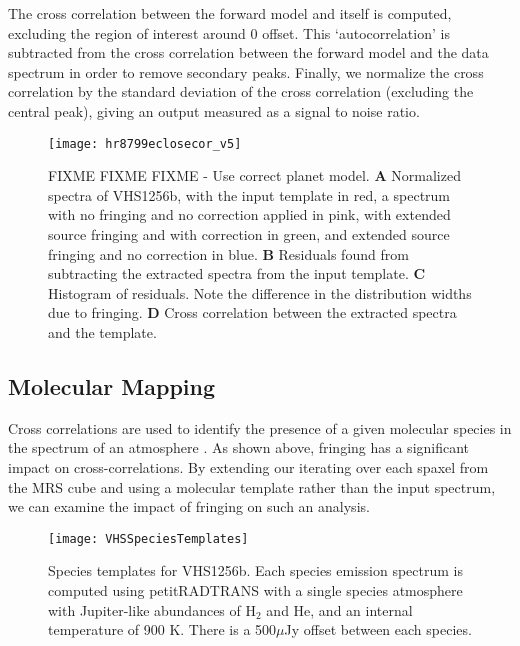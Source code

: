 The cross correlation between the forward model and itself is computed, excluding the region of interest around 0 offset. 
This `autocorrelation' is subtracted from the cross correlation between the forward model and the data spectrum in order to remove secondary peaks.
Finally, we normalize the cross correlation by the standard deviation of the cross correlation (excluding the central peak), giving an output measured as a signal to noise ratio.
\begin{figure}[h]
	\centering
	\texttt{[image: hr8799eclosecor\_v5]}
	\caption{FIXME FIXME FIXME - Use correct planet model. \textbf{A} Normalized spectra of VHS1256b, with the input template in red, a spectrum with no fringing and no correction applied in pink, with extended source fringing and with correction in green, and extended source fringing and no correction in blue. \textbf{B} Residuals found from subtracting the extracted spectra from the input template. \textbf{C} Histogram of residuals. Note the difference in the distribution widths due to fringing. \textbf{D} Cross correlation between the extracted spectra and the template.}
	\label{fig:CrossCor1D}	
\end{figure}

\subsection{Molecular Mapping}
Cross correlations are used to identify the presence of a given molecular species in the spectrum of an atmosphere \parencite{Hoeijmakers2018,Haffert2019}.
As shown above, fringing has a significant impact on cross-correlations. 
By extending our iterating over each spaxel from the MRS cube and using a molecular template rather than the input spectrum, we can examine the impact of fringing on such an analysis.
\begin{figure}[t]
	\texttt{[image: VHSSpeciesTemplates]}
	\caption{Species templates for VHS1256b. Each species emission spectrum is computed using petitRADTRANS with a single species atmosphere with Jupiter-like abundances of H$_{2}$ and He, and an internal temperature of 900 K. There is a 500$\mu$Jy offset between each species.}
	\label{fig:speciestemplates}
\end{figure}

